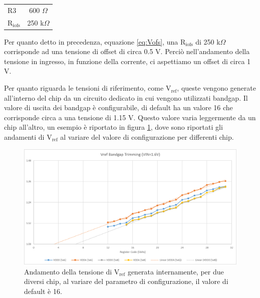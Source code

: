\begin{center}
\begin{tabular}{lc}
\hline
$\mathrm{R3}$ & 600 $\Omega$ \\%
$\mathrm{R_{iofs}}$ & 250 k$\Omega$\\ 
\hline
\end{tabular}
\end{center}
Per quanto detto in precedenza, equazione \ref{eq:Vofs}, una $\mathrm{R_{iofs}}$ di 250 k$\Omega$ corrisponde ad una tensione di offset di circa 0.5 V. Perciò nell'andamento della tensione in ingresso, in funzione della corrente, ci aspettiamo un offset di circa 1 V.

Per quanto riguarda le tensioni di riferimento, come $\mathrm{V_{ref}}$, queste vengono generate all'interno del chip da un circuito dedicato in cui vengono utilizzati bandgap. Il valore di uscita dei bandgap è configurabile, di default ha un valore 16 che corrisponde circa a una tensione di 1.15 V. 
Questo valore varia leggermente da un chip all'altro, un esempio è riportato in figura \ref{bandgap_trimming}, dove sono riportati gli andamenti di $\mathrm{V_{ref}}$ al variare del valore di configurazione per differenti chip.

\begin{figure}
\centering
\includegraphics[scale=.5]{Immagini/bandgap_trimming}
\caption{Andamento della tensione di $\mathrm{V_{ref}}$ generata internamente, per due diversi chip, al variare del parametro di configurazione, il valore di default è 16.}
\label{bandgap_trimming}
\end{figure}


